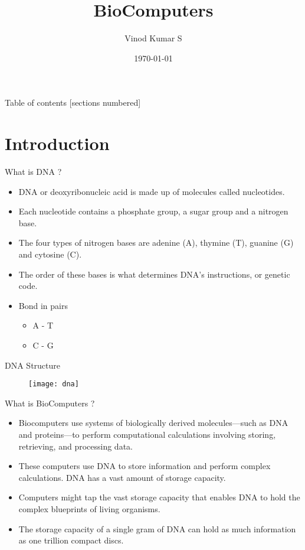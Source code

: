 \documentclass[10pt]{beamer}
\title{BioComputers}
\date{\today}
\author{Vinod Kumar S}
\institute{College of Engineering Trivandrum}
\begin{document}
\maketitle

\begin{frame}{Table of contents}
  [sections numbered]
  \tableofcontents[hideallsubsections]
\end{frame}

\section{Introduction}

\begin{frame}[fragile]{What is DNA ?}
  \begin{itemize}
      \item{DNA or deoxyribonucleic acid is made up of molecules called nucleotides.}
      \item{Each nucleotide contains a phosphate group, a sugar group and a nitrogen base.}
      \item{The four types of nitrogen bases are adenine (A), thymine (T), guanine (G) and cytosine (C).}
      \item{The order of these bases is what determines DNA's instructions, or genetic code.}
      \item{ Bond in pairs
          \begin{itemize}
        \item A - T
                \item C - G 
      \end{itemize}}
  \end{itemize}
\end{frame}

\begin{frame}{DNA Structure}
  \begin{figure}
      \texttt{[image: dna]}   
  \end{figure}
\end{frame}

\begin{frame}[fragile]{What is BioComputers ?}
         \begin{itemize}
      \item{Biocomputers use systems of biologically derived molecules—such as DNA and proteins—to perform computational calculations involving storing, retrieving, and processing data.}
            \item{These computers use DNA to store information and perform complex calculations. DNA has a vast amount of storage capacity.}
            \item{ Computers might tap the vast storage capacity that enables DNA to hold the complex blueprints of living organisms.}
            \item{The storage capacity of a single gram of DNA can hold as much information as one trillion compact discs.}
    \end{itemize}
\end{frame}
\end{document}
